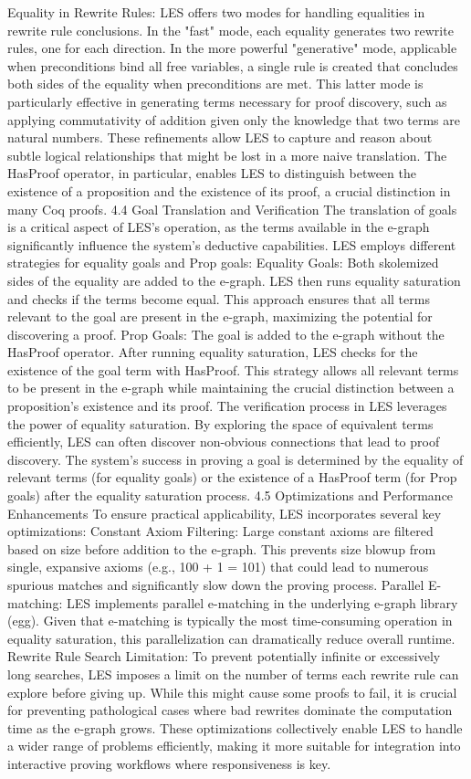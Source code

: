 Equality in Rewrite Rules: LES offers two modes for handling equalities in rewrite rule conclusions. In the "fast" mode, each equality generates two rewrite rules, one for each direction. In the more powerful "generative" mode, applicable when preconditions bind all free variables, a single rule is created that concludes both sides of the equality when preconditions are met. This latter mode is particularly effective in generating terms necessary for proof discovery, such as applying commutativity of addition given only the knowledge that two terms are natural numbers.
These refinements allow LES to capture and reason about subtle logical relationships that might be lost in a more naive translation. The HasProof operator, in particular, enables LES to distinguish between the existence of a proposition and the existence of its proof, a crucial distinction in many Coq proofs.
4.4 Goal Translation and Verification
The translation of goals is a critical aspect of LES's operation, as the terms available in the e-graph significantly influence the system's deductive capabilities. LES employs different strategies for equality goals and Prop goals:
Equality Goals: Both skolemized sides of the equality are added to the e-graph. LES then runs equality saturation and checks if the terms become equal. This approach ensures that all terms relevant to the goal are present in the e-graph, maximizing the potential for discovering a proof.
Prop Goals: The goal is added to the e-graph without the HasProof operator. After running equality saturation, LES checks for the existence of the goal term with HasProof. This strategy allows all relevant terms to be present in the e-graph while maintaining the crucial distinction between a proposition's existence and its proof.
The verification process in LES leverages the power of equality saturation. By exploring the space of equivalent terms efficiently, LES can often discover non-obvious connections that lead to proof discovery. The system's success in proving a goal is determined by the equality of relevant terms (for equality goals) or the existence of a HasProof term (for Prop goals) after the equality saturation process.
4.5 Optimizations and Performance Enhancements
To ensure practical applicability, LES incorporates several key optimizations:
Constant Axiom Filtering: Large constant axioms are filtered based on size before addition to the e-graph. This prevents size blowup from single, expansive axioms (e.g., 100 + 1 = 101) that could lead to numerous spurious matches and significantly slow down the proving process.
Parallel E-matching: LES implements parallel e-matching in the underlying e-graph library (egg). Given that e-matching is typically the most time-consuming operation in equality saturation, this parallelization can dramatically reduce overall runtime.
Rewrite Rule Search Limitation: To prevent potentially infinite or excessively long searches, LES imposes a limit on the number of terms each rewrite rule can explore before giving up. While this might cause some proofs to fail, it is crucial for preventing pathological cases where bad rewrites dominate the computation time as the e-graph grows.
These optimizations collectively enable LES to handle a wider range of problems efficiently, making it more suitable for integration into interactive proving workflows where responsiveness is key.